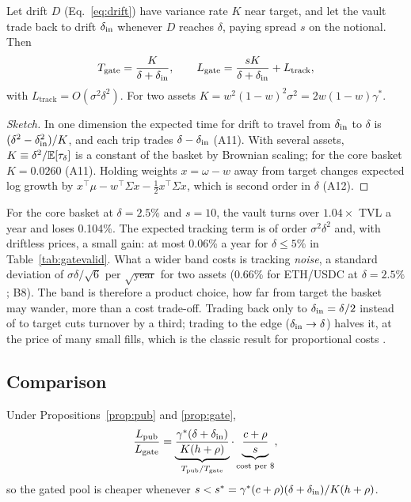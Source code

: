 \begin{prop}\label{prop:gate}
Let drift $D$ (Eq.~\ref{eq:drift}) have variance rate $K$ near target, and let the vault trade back to drift $\delta_{\mathrm{in}}$ whenever $D$ reaches $\delta$, paying spread $s$ on the notional. Then
\begin{equation}
T_{\mathrm{gate}}=\frac{K}{\delta+\delta_{\mathrm{in}}},\qquad L_{\mathrm{gate}}=\frac{sK}{\delta+\delta_{\mathrm{in}}}+L_{\mathrm{track}},
\label{eq:gate}
\end{equation}
with $L_{\mathrm{track}}=O(\sigma^2\delta^2)$. For two assets $K=w^2(1-w)^2\sigma^2=2w(1-w)\gamma^{*}$.
\end{prop}
\begin{proof}[Sketch]
In one dimension the expected time for drift to travel from $\delta_{\mathrm{in}}$ to $\delta$ is $(\delta^2-\delta_{\mathrm{in}}^2)/K$, and each trip trades $\delta-\delta_{\mathrm{in}}$ (A11). With several assets, $K\equiv\delta^2/\mathbb{E}[\tau_\delta]$ is a constant of the basket by Brownian scaling; for the core basket $K=0.0260$ (A11). Holding weights $x=\omega-w$ away from target changes expected log growth by $x^{\top}\mu-w^{\top}\Sigma x-\tfrac12x^{\top}\Sigma x$, which is second order in $\delta$ (A12).
\end{proof}

For the core basket at $\delta=2.5\%$ and $s=10$\bps, the vault turns over $1.04\times$ TVL a year and loses 0.104\%. The expected tracking term is of order $\sigma^2\delta^2$ and, with driftless prices, a small gain: at most 0.06\% a year for $\delta\le5\%$ in Table~\ref{tab:gatevalid}. What a wider band costs is tracking \emph{noise}, a standard deviation of $\sigma\delta/\sqrt6$ per $\sqrt{\text{year}}$ for two assets (0.66\% for ETH/USDC at $\delta=2.5\%$; B8). The band is therefore a product choice, how far from target the basket may wander, more than a cost trade-off. Trading back only to $\delta_{\mathrm{in}}=\delta/2$ instead of to target cuts turnover by a third; trading to the edge ($\delta_{\mathrm{in}}\to\delta$) halves it, at the price of many small fills, which is the classic result for proportional costs \cite{davisnorman,magill}.

\subsection{Comparison}

\begin{prop}\label{prop:ratio}
Under Propositions~\ref{prop:pub} and \ref{prop:gate},
\begin{equation}
\frac{L_{\mathrm{pub}}}{L_{\mathrm{gate}}}=\underbrace{\frac{\gamma^{*}(\delta+\delta_{\mathrm{in}})}{K(h+\rho)}}_{T_{\mathrm{pub}}/T_{\mathrm{gate}}}\cdot\underbrace{\frac{c+\rho}{s}}_{\text{cost per \$}},
\label{eq:ratio}
\end{equation}
so the gated pool is cheaper whenever $s<s^{*}=\gamma^{*}(c+\rho)(\delta+\delta_{\mathrm{in}})/K(h+\rho)$.
\end{prop}

